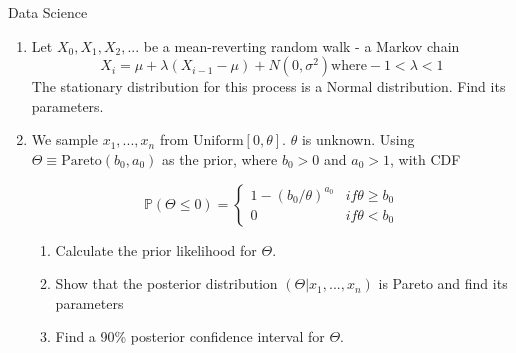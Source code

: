\documentclass{tripos}
\begin{document}
\begin{question}[MockIA,year=2025,paper=2,question=5,author=nobody]{Data Science}

  \begin{enumerate}
  \item Let $X_0, X_1, X_2, ...$ be a mean-reverting random walk - a Markov chain
    \[
    X_i = \mu + \lambda{}(X_{i-1}-\mu) + N(0,\sigma^2) \mbox{where} -1 < \lambda < 1
    \]
The stationary distribution for this process is a Normal distribution. Find its parameters.

\item We sample $x_1,...,x_n$ from $\mbox{Uniform}[0,\theta]$. $\theta$ is unknown. Using
  $\Theta \equiv \mbox{Pareto}(b_0, a_0)$ as the prior, where $b_0 > 0$ and $a_0 > 1$, with
  CDF

  \[
  \mathbb{P}(\Theta \le 0) = \begin{cases}
    1-{(b_0/\theta{})}^{a_0} & if \theta \ge b_0 \\
    0 & if \theta < b_0
  \end{cases}
  \]

  \begin{enumerate}
  \item Calculate the prior likelihood for $\Theta$. 
  \item Show that the posterior distribution $(\Theta | x_1,...,x_n)$ is Pareto and find its parameters 
  \item Find a 90\% posterior confidence interval for $\Theta{}$. 
  \end{enumerate}
\end{enumerate}
  \end{question}
  \eject
\end{document}
